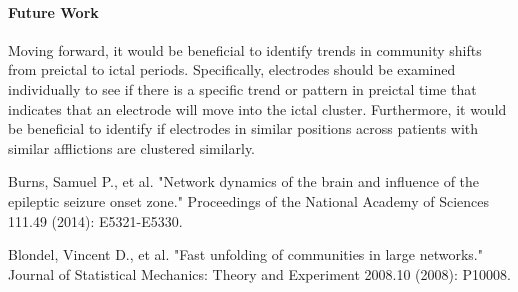 \documentclass[12pt]{article}
\begin{document}
\paragraph{Future Work}
Moving forward, it would be beneficial to identify trends in community shifts from preictal to ictal periods. Specifically, electrodes should be examined individually to see if there is a specific trend or pattern in preictal time that indicates that an electrode will move into the ictal cluster. Furthermore, it would be beneficial to identify if electrodes in similar positions across patients with similar afflictions are clustered similarly.

\newpage
\begin{thebibliography}{9}

Burns, Samuel P., et al. "Network dynamics of the brain and influence of the epileptic seizure onset zone." Proceedings of the National Academy of Sciences 111.49 (2014): E5321-E5330.
  
Blondel, Vincent D., et al. "Fast unfolding of communities in large networks." Journal of Statistical Mechanics: Theory and Experiment 2008.10 (2008): P10008.

\end{thebibliography}
\end{document}
